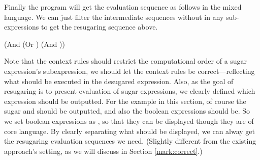 Finally the program  will get the evaluation sequence as follows in the mixed language. We can just filter the intermediate sequences without  in any sub-expressions to get the resugaring sequence above. 

{\scriptsize
\begin{Codes}
    (And (Or \true \false) (And \false \true))
\OneStep{ \false}
\end{Codes}
}
Note that the context rules should restrict the computational order of a sugar expression's subexpression, we should let the context rules be correct---reflecting what should be executed in the desugared expression. Also, as the goal of resugaring is to present evaluation of sugar expressions, we clearly defined which expression should be outputted. For the example in this section, of course the sugar  and  should be outputted, and also the boolean expressions should be. So we set boolean expressions as , so that they can be displayed though they are of core language. By clearly separating what should be displayed, we can alway get the resugaring evaluation sequences we need. (Slightly different from the existing approach's setting, as we will discuss in Section \ref{mark:correct}.)